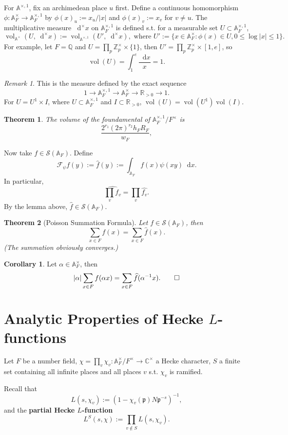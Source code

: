 \documentclass{article}
\newtheorem{theorem}{Theorem}
\theoremstyle{definition}
\newtheorem{corollary}{Corollary}[section]
\theoremstyle{remark}
\newtheorem*{remark}{Remark}
\renewcommand{\hat}{\widehat}
\newcommand{\R}{\mathbb{R}}
\newcommand{\C}{\mathbb{C}}
\newcommand{\Q}{\mathbb{Q}}
\newcommand{\Z}{\mathbb{Z}}
\newcommand{\adele}[1]{\mathbb{A}_{#1}}
\newcommand{\idele}[1]{\mathbb{A}_{#1}^{\times}}
\newcommand{\ideone}[1]{\mathbb{A}_{#1}^{\times, 1}}
\newcommand{\dx}{\mathop{}\!\mathrm{d}x}
\newcommand{\dxm}{\mathop{}\!\mathrm{d}^{\times}x}
\DeclareMathOperator{\vol}{vol}
\begin{document}
For $\ideone{}$, fix an archimedean place $u$ first. Define a continuous homomorphism $\phi: \idele{F} \to\ideone{F}$ by $\phi(x)_u := x_u/|x|$ and $\phi(x)_v := x_v$ for $v \neq u$.
The multiplicative measure $\dxm$ on $\ideone{F}$ is defined s.t. for a measurable set $U\subset \ideone{F}$, \[\vol_{\idele{}}(U, \dxm) := \vol_{\ideone{}}(U', \dxm),\text{ where } U' := \{x\in\idele{F}: \phi(x)\in U, 0 \le \log|x|\le 1\}.\]
For example, let $F = \Q$ and $U = \prod_p\Z_p^\times\times\{1\}$, then $U' = \prod_p\Z_p^\times \times[1, e]$, so \[\vol(U) = \int_{1}^e \frac{\dx}{x} = 1.\]
\begin{remark}
    This is the measure defined by the exact sequence \[1\to\ideone{F}\to\idele{F}\to\R_{>0}\to 1.\]
    For $U = U^1 \times I$, where $U\subset \ideone{F}$ and $I\subset \R_{> 0}$, $\vol(U) = \vol(U^1)\vol(I)$.
\end{remark}
\begin{theorem}
    The volume of the foundamental of $\ideone{F}/F^{\times}$ is \[\frac{2^{r_1}(2\pi)^{r_2}h_FR_F}{w_F},\]
\end{theorem}

Now take $f\in \mathcal{S}(\adele{F})$. Define \[\mathcal{F}_\psi f(y) := \hat{f}(y) := \int_{\adele{F}} f(x)\psi(xy)\dx.\]
In particular, \[\hat{\prod_v f_v} = \prod_v \hat{f_v}.\] By the lemma above, $\hat{f}\in\mathcal{S}(\adele{F})$.
\begin{theorem}
    [Poisson Summation Formula] Let $f\in\mathcal{S}(\adele{F})$, then \[\sum_{x\in F} f(x) = \sum_{x\in F}\hat{f}(x).\]
    (The summation obviously converges.)
\end{theorem}

\begin{corollary}
    Let $\alpha\in\idele{F}$, then \[|\alpha|\sum_{x\in F}f(\alpha x) = \sum_{x\in F}\hat{f}(\alpha^{-1}x).
    \qed\]
\end{corollary}

\section{Analytic Properties of Hecke $L$-functions}
Let $F$ be a number field, $\chi  = \prod_v\chi_v: \mathbb{A}_F^{\times}/F^{\times} \to\C^{\times}$ a Hecke character, $S$ a finite set containing all infinite places and all places $v$ s.t. $\chi_v$ is ramified.

Recall that \[L(s, \chi_v) := (1 - \chi_v(\mathfrak{p})N\mathfrak{p}^{-s})^{-1},\]
and the \textbf{partial Hecke $L$-function} \[L^S(s, \chi) := \prod_{v\notin S} L(s, \chi_v).\]
\end{document}
